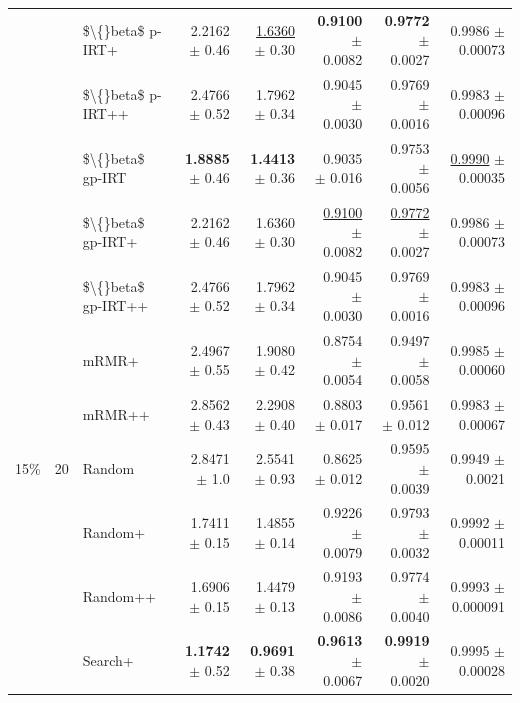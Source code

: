 \begin{longtable}{llp{}rrrrr}
 &  & \$\textbackslash\{\}beta\$ p-IRT+ & 2.2162 {\scriptsize $\pm$ 0.46} & \underline{1.6360} {\scriptsize $\pm$ 0.30} & \textbf{0.9100} {\scriptsize $\pm$ 0.0082} & \textbf{0.9772} {\scriptsize $\pm$ 0.0027} & 0.9986 {\scriptsize $\pm$ 0.00073} \\
 &  & \$\textbackslash\{\}beta\$ p-IRT++ & 2.4766 {\scriptsize $\pm$ 0.52} & 1.7962 {\scriptsize $\pm$ 0.34} & 0.9045 {\scriptsize $\pm$ 0.0030} & 0.9769 {\scriptsize $\pm$ 0.0016} & 0.9983 {\scriptsize $\pm$ 0.00096} \\
 &  & \$\textbackslash\{\}beta\$ gp-IRT & \textbf{1.8885} {\scriptsize $\pm$ 0.46} & \textbf{1.4413} {\scriptsize $\pm$ 0.36} & 0.9035 {\scriptsize $\pm$ 0.016} & 0.9753 {\scriptsize $\pm$ 0.0056} & \underline{0.9990} {\scriptsize $\pm$ 0.00035} \\
 &  & \$\textbackslash\{\}beta\$ gp-IRT+ & 2.2162 {\scriptsize $\pm$ 0.46} & 1.6360 {\scriptsize $\pm$ 0.30} & \underline{0.9100} {\scriptsize $\pm$ 0.0082} & \underline{0.9772} {\scriptsize $\pm$ 0.0027} & 0.9986 {\scriptsize $\pm$ 0.00073} \\
 &  & \$\textbackslash\{\}beta\$ gp-IRT++ & 2.4766 {\scriptsize $\pm$ 0.52} & 1.7962 {\scriptsize $\pm$ 0.34} & 0.9045 {\scriptsize $\pm$ 0.0030} & 0.9769 {\scriptsize $\pm$ 0.0016} & 0.9983 {\scriptsize $\pm$ 0.00096} \\
 &  & mRMR+ & 2.4967 {\scriptsize $\pm$ 0.55} & 1.9080 {\scriptsize $\pm$ 0.42} & 0.8754 {\scriptsize $\pm$ 0.0054} & 0.9497 {\scriptsize $\pm$ 0.0058} & 0.9985 {\scriptsize $\pm$ 0.00060} \\
 &  & mRMR++ & 2.8562 {\scriptsize $\pm$ 0.43} & 2.2908 {\scriptsize $\pm$ 0.40} & 0.8803 {\scriptsize $\pm$ 0.017} & 0.9561 {\scriptsize $\pm$ 0.012} & 0.9983 {\scriptsize $\pm$ 0.00067} \\
\midrule
15\% & 20 & Random & 2.8471 {\scriptsize $\pm$ 1.0} & 2.5541 {\scriptsize $\pm$ 0.93} & 0.8625 {\scriptsize $\pm$ 0.012} & 0.9595 {\scriptsize $\pm$ 0.0039} & 0.9949 {\scriptsize $\pm$ 0.0021} \\
 &  & Random+ & 1.7411 {\scriptsize $\pm$ 0.15} & 1.4855 {\scriptsize $\pm$ 0.14} & 0.9226 {\scriptsize $\pm$ 0.0079} & 0.9793 {\scriptsize $\pm$ 0.0032} & 0.9992 {\scriptsize $\pm$ 0.00011} \\
 &  & Random++ & 1.6906 {\scriptsize $\pm$ 0.15} & 1.4479 {\scriptsize $\pm$ 0.13} & 0.9193 {\scriptsize $\pm$ 0.0086} & 0.9774 {\scriptsize $\pm$ 0.0040} & 0.9993 {\scriptsize $\pm$ 0.000091} \\
 &  & Search+ & \textbf{1.1742} {\scriptsize $\pm$ 0.52} & \textbf{0.9691} {\scriptsize $\pm$ 0.38} & \textbf{0.9613} {\scriptsize $\pm$ 0.0067} & \textbf{0.9919} {\scriptsize $\pm$ 0.0020} & 0.9995 {\scriptsize $\pm$ 0.00028} \\

\end{longtable}
